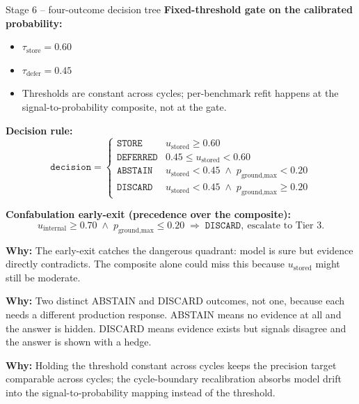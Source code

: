 \documentclass[10pt,aspectratio=169]{beamer}
\newcommand{\why}[1]{{\color{caemamber}\textbf{Why:}} #1}
\begin{document}
\begin{frame}{Stage 6 -- four-outcome decision tree}
  \scriptsize
  \textbf{Fixed-threshold gate on the calibrated probability:}
  \begin{itemize}\scriptsize
    \item $\tau_{\text{store}} = 0.60$
    \item $\tau_{\text{defer}} = 0.45$
    \item Thresholds are constant across cycles; per-benchmark refit happens at the signal-to-probability composite, not at the gate.
  \end{itemize}

  \vspace{0.3em}
  \textbf{Decision rule:}
  \[
  \texttt{decision} = \begin{cases}
    \texttt{STORE}    & u_{\text{stored}} \ge 0.60 \\
    \texttt{DEFERRED} & 0.45 \le u_{\text{stored}} < 0.60 \\
    \texttt{ABSTAIN}  & u_{\text{stored}} < 0.45 \;\wedge\; p_{\text{ground,max}} < 0.20 \\
    \texttt{DISCARD}  & u_{\text{stored}} < 0.45 \;\wedge\; p_{\text{ground,max}} \ge 0.20
  \end{cases}
  \]

  \textbf{Confabulation early-exit (precedence over the composite):}
  \[
    u_{\text{internal}} \ge 0.70 \;\wedge\; p_{\text{ground,max}} \le 0.20 \;\Rightarrow\; \texttt{DISCARD},\ \text{escalate to Tier 3}.
  \]

  \why{The early-exit catches the dangerous quadrant: model is sure but evidence directly contradicts. The composite alone could miss this because $u_{\text{stored}}$ might still be moderate.}

  \why{Two distinct ABSTAIN and DISCARD outcomes, not one, because each needs a different production response. ABSTAIN means no evidence at all and the answer is hidden. DISCARD means evidence exists but signals disagree and the answer is shown with a hedge.}

  \why{Holding the threshold constant across cycles keeps the precision target comparable across cycles; the cycle-boundary recalibration absorbs model drift into the signal-to-probability mapping instead of the threshold.}
\end{frame}
\end{document}
